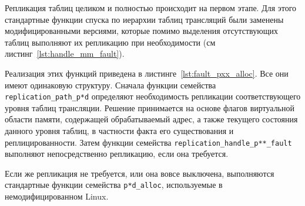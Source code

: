 Репликация таблиц целиком и полностью происходит на первом этапе. Для этого стандартные функции спуска по иерархии таблиц трансляций были заменены модифицированными версиями, которые помимо выделения отсутствующих таблиц выполняют их репликацию при необходимости (см листинг~\ref{lst:handle_mm_fault}).

Реализация этих функций приведена в листинге~\ref{lst:fault_pxx_alloc}. Все они имеют одинаковую структуру. Сначала функции семейства \texttt{replication\_path\_p*d} определяют необходимость репликации соответствующего уровня таблиц трансляции. Решение принимается на основе флагов виртуальной области памяти, содержащей обрабатываемый адрес, а также текущего состояния данного уровня таблиц, в частности факта его существования и реплицированности. Затем функции семейства \texttt{replication\_handle\_p**\_fault} выполняют непосредственно репликацию, если она требуется.

Если же репликация не требуется, или она вовсе выключена, выполняются стандартные функции семейства \texttt{p*d\_alloc}, используемые в немодифицированном Linux.

